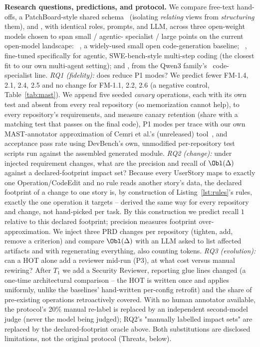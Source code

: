 \noindent\textbf{Research questions, predictions, and protocol.}
We compare free-text hand-offs, a PatchBoard-style shared
schema~\cite{zhang2026patchboard} (isolating \emph{relating} views from
\emph{structuring} them), and \tool{}, with identical roles, prompts, and
LLM, across three open-weight models chosen to span small / agentic-
specialist / large points on the current open-model landscape:
~\cite{hui2024qwen25coder}, a widely-used small
open code-generation baseline; ~\cite{mistral2025devstral},
fine-tuned specifically for agentic, SWE-bench-style multi-step coding
(the closest fit to our own multi-agent setting); and
, from the Qwen3 family's~\cite{qwen2025qwen3}
code-specialist line. \emph{RQ1 (fidelity):} does \tool{} reduce P1 modes?
We predict fewer FM-1.4, 2.1, 2.4, 2.5 and no
change for FM-1.1, 2.2, 2.6 (a negative control, Table~\ref{tab:mast}). We
append five seeded \emph{canary} operations, each with its own test and
absent from every real repository (so memorization cannot help), to every
repository's requirements, and measure canary retention (share with a
matching test that passes on the final code), P1 modes per trace with our
own MAST-annotator approximation of Cemri et al.'s
(unreleased) tool~\cite{cemri2025mast}, and acceptance pass rate using
DevBench's own, unmodified per-repository test scripts run against the
assembled generated module. \emph{RQ2 (change):} under injected requirement
changes, what are the precision and recall of $\Obl(\Delta)$ against a
declared-footprint impact set? Because every UserStory maps to exactly one
Operation/CodeEdit and no rule reads another story's data, the declared
footprint of a change to one story is, by construction of
Listing~\ref{lst:rules}'s rules, exactly the one operation it targets --
derived the same way for every repository and change, not hand-picked per
task. By this construction we predict recall $1$ relative to this
declared footprint; precision measures footprint over-approximation. We
inject three PRD changes per repository (tighten, add, remove a criterion)
and compare $\Obl(\Delta)$ with an LLM asked to list affected artifacts and
with regenerating everything, also counting tokens. \emph{RQ3 (evolution):}
can a HOT alone add a reviewer mid-run (P3), at what cost versus manual
rewiring? After $T_1$ we add a Security Reviewer, reporting glue lines
changed (a one-time architectural comparison -- the HOT is written once and
applies uniformly, unlike the baselines' hand-written per-config retrofit)
and the share of pre-existing operations retroactively covered. With no
human annotator available, the protocol's 20\% manual re-label is replaced
by an independent second-model judge (never the model being judged); RQ2's
"manually labelled impact sets" are replaced by the declared-footprint
oracle above. Both substitutions are disclosed limitations, not the
original protocol (Threats, below).

